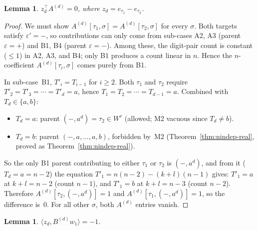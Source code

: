 \documentclass{amsart}
\newtheorem{lemma}[theorem]{Lemma}
\theoremstyle{definition}
\theoremstyle{remark}
\begin{document}
\begin{lemma}\label{lem:zdA-zero}
$z_d^\top A^{(d)} = 0$, where $z_d = e_{\tau_1} - e_{\tau_2}$.
\end{lemma}

\begin{proof}
We must show $A^{(d)}[\tau_1, \sigma] = A^{(d)}[\tau_2, \sigma]$
for every $\sigma$.  Both targets satisfy $\varepsilon' = -$, so
contributions can only come from sub-cases A2, A3 (parent
$\varepsilon = +$) and B1, B4 (parent $\varepsilon = -$).
Among these, the digit-pair count is constant ($\le 1$) in A2,
A3, and B4; only B1 produces a count linear in $n$.  Hence the
$n$-coefficient $A^{(d)}[\tau_i, \sigma]$ comes purely from B1.

In sub-case~B1, $T'_i = T_{i-1}$ for $i \ge 2$.  Both $\tau_1$
and $\tau_2$ require $T'_2 = T'_3 = \cdots = T'_d = a$, hence
$T_1 = T_2 = \cdots = T_{d-1} = a$.  Combined with
$T_d \in \{a, b\}$:
\begin{itemize}
\item $T_d = a$: parent $(-, a^d) = \tau_2 \in W^c$ (allowed; M2
  vacuous since $T_d \neq b$).
\item $T_d = b$: parent $(-, a, \ldots, a, b)$, forbidden by~M2
  (Theorem~\ref{thm:nindep-real}, proved as
  Theorem~\ref{thm:nindep-real}).
\end{itemize}
So the only B1 parent contributing to either $\tau_1$ or $\tau_2$
is $(-, a^d)$, and from it ($T_d = a = n-2$) the equation
$T'_1 = n(n-2) - (k+l)(n-1)$ gives:
$T'_1 = a$ at $k + l = n-2$ (count $n-1$), and $T'_1 = b$ at
$k + l = n-3$ (count $n-2$).  Therefore
$A^{(d)}[\tau_2, (-, a^d)] = 1$ and
$A^{(d)}[\tau_1, (-, a^d)] = 1$, so the difference is~$0$.
For all other $\sigma$, both $A^{(d)}$ entries vanish.
\end{proof}

\begin{lemma}\label{lem:xi-minus-one}
$\langle z_d, B^{(d)} w_1\rangle = -1$.
\end{lemma}
\end{document}
